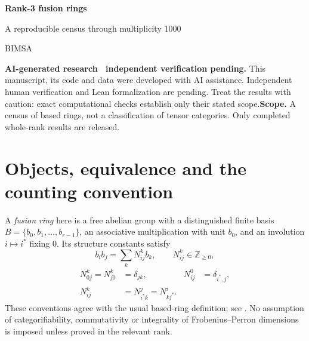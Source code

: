 \documentclass[11pt,a4paper]{article}
\theoremstyle{definition}\newtheorem{definition}[theorem]{Definition}\newtheorem{remark}[theorem]{Remark}
\newcommand{\NN}{\mathbb Z_{\geq0}}\newcommand{\FPdim}{\operatorname{FPdim}}
\begin{document}
\par\vspace{1cm}
{\sffamily\Huge\bfseries\color{ink} Rank-3 fusion rings\par}
\vspace{0.35cm}
{\sffamily\Large A reproducible census through multiplicity 1000\par}
\vspace{0.65cm}{\large Sébastien Palcoux}\par{\small BIMSA}\par\vspace{0.35cm}{\small Computational companion, 26 October 2026}\par\vspace{0.8cm}
\begin{abstract}
We explain the exact enumeration of all based fusion rings of rank 3 through multiplicity 1000, comprising 460,353 isomorphism classes. The account separates the mathematical coverage argument, the completed search, and independent verification of the emitted tensors. All duality types are included, and no categorifiability filter is applied. Code, machine-readable counts, full multiplication tensors and provenance records accompany the text.
\end{abstract}\vspace{0.4cm}\noindent\textbf{AI-generated research \textperiodcentered\ independent verification pending.} This manuscript, its code and data were developed with AI assistance. Independent human verification and Lean formalization are pending. Treat the results with caution: exact computational checks establish only their stated scope.\vfill\noindent\textbf{Scope.} A census of based rings, not a classification of tensor categories. Only completed whole-rank results are released.\newpage\tableofcontents\newpage

\section{Objects, equivalence and the counting convention}
A \emph{fusion ring} here is a free abelian group with a distinguished finite basis
$B=\{b_0,b_1,\ldots,b_{r-1}\}$, an associative multiplication with unit $b_0$,
and an involution $i\mapsto i^*$ fixing $0$. Its structure constants satisfy
\[
b_i b_j=\sum_k N_{ij}^{k}b_k,\qquad N_{ij}^{k}\in\NN,
\]
\begin{align}
N_{0j}^{k}=N_{j0}^{k}&=\delta_{jk},&N_{ij}^{0}&=\delta_{i^*,j},\\
N_{ij}^{k}&=N_{i^*k}^{j}=N_{kj^*}^{i}.&&\label{eq:reciprocity}
\end{align}
These conventions agree with the usual based-ring definition; see
\cite{EGNO,VS}. No assumption of categorifiability, commutativity or integrality
of Frobenius--Perron dimensions is imposed unless proved in the relevant rank.
\end{document}
